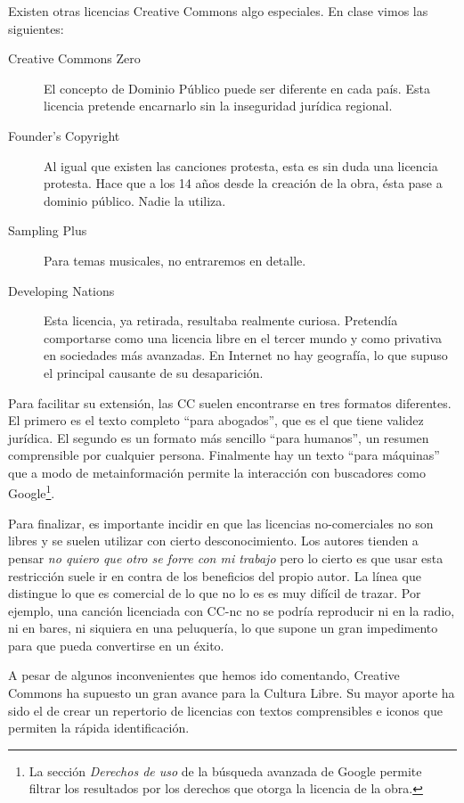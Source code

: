 Existen otras licencias Creative Commons algo especiales. En clase
vimos las siguientes:
\begin{description}
\item[Creative Commons Zero] El concepto de Dominio Público puede ser
  diferente en cada país. Esta licencia pretende encarnarlo sin la
  inseguridad jurídica regional.
\item[Founder's Copyright] Al igual que existen las canciones
  protesta, esta es sin duda una licencia protesta. Hace que a los 14
  años desde la creación de la obra, ésta pase a dominio
  público. Nadie la utiliza.
\item[Sampling Plus] Para temas musicales, no entraremos en detalle.
\item[Developing Nations] Esta licencia, ya retirada, resultaba
  realmente curiosa. Pretendía comportarse como una licencia libre en
  el tercer mundo y como privativa en sociedades más avanzadas. En
  Internet no hay geografía, lo que supuso el principal causante de su
  desaparición.
\end{description}

Para facilitar su extensión, las CC suelen encontrarse en tres
formatos diferentes. El primero es el texto completo ``para
abogados'', que es el que tiene validez jurídica. El segundo es un
formato más sencillo ``para humanos'', un resumen comprensible por
cualquier persona. Finalmente hay un texto ``para máquinas'' que a
modo de metainformación permite la interacción con buscadores como
Google\footnote{La sección \emph{Derechos de uso} de la búsqueda
  avanzada de Google permite filtrar los resultados por los derechos
  que otorga la licencia de la obra.}.

Para finalizar, es importante incidir en que las licencias
no-comerciales no son libres y se suelen utilizar con cierto
desconocimiento. Los autores tienden a pensar \emph{no quiero que otro
  se forre con mi trabajo} pero lo cierto es que usar esta restricción
suele ir en contra de los beneficios del propio autor. La línea que
distingue lo que es comercial de lo que no lo es es muy difícil de
trazar. Por ejemplo, una canción licenciada con CC-nc no se podría
reproducir ni en la radio, ni en bares, ni siquiera en una peluquería,
lo que supone un gran impedimento para que pueda convertirse en un
éxito. 

A pesar de algunos inconvenientes que hemos ido comentando, Creative
Commons ha supuesto un gran avance para la Cultura Libre. Su mayor
aporte ha sido el de crear un repertorio de licencias con textos
comprensibles e iconos que permiten la rápida identificación.

